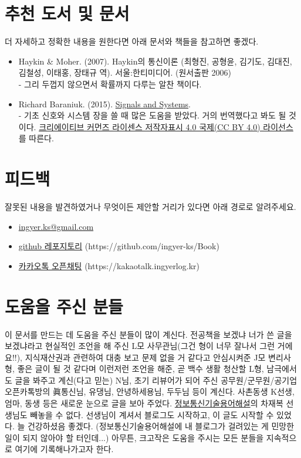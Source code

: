 \section{추천 도서 및 문서}
더 자세하고 정확한 내용을 원한다면 아래 문서와 책들을 참고하면 좋겠다.
\begin{itemize}
    \item Haykin \& Moher. (2007). Haykin의 통신이론 (최형진, 공형윤, 김기도, 김대진, 김철성, 이태홍, 장태규 역). 서울:한티미디어. (원서출판 2006) \\
    - 그리 두껍지 않으면서 확률까지 다루는 알찬 책이다.
    \item Richard Baraniuk. (2015). \href{https://cnx.org/contents/77608400-65b9-4f03-8a5f-536c611866bb@15.4/Signals-and-Systems}{Signals and Systems}. \\
    - 기초 신호와 시스템 장을 쓸 때 많은 도움을 받았다. 거의 번역했다고 봐도 될 것이다. \href{https://creativecommons.org/licenses/by/4.0/deed.ko}{크리에이티브 커먼즈 라이센스 저작자표시 4.0 국제(CC BY 4.0) 라이선스}를 따른다.
\end{itemize}

\section{피드백}
잘못된 내용을 발견하였거나 무엇이든 제안할 거리가 있다면 아래 경로로 알려주세요.
\begin{itemize}
    \item \href{mailto:ingyer.ks@gmail.com}{ingyer.ks@gmail.com}
    \item \href{https://github.com/ingyer-ks/Book}{github 레포지토리} (https://github.com/ingyer-ks/Book)
    \item \href{https://kakaotalk.ingyerlog.kr}{카카오톡 오픈채팅} (https://kakaotalk.ingyerlog.kr)
\end{itemize}
\section{도움을 주신 분들}
이 문서를 만드는 데 도움을 주신 분들이 많이 계신다.
전공책을 보겠냐 너가 쓴 글을 보겠냐라고 현실적인 조언을 해 주신 L모 사무관님(그건 형이 너무 잘나서 그런 거에요!!),
지식재산권과 관련하여 대충 보고 문제 없을 거 같다고 안심시켜준 J모 변리사 형, 좋은 글이 될 것 같다며 이런저런 조언을 해준, 곧 백수 생활 청산할 L형, 
남극에서도 글을 봐주고 계신(다고 믿는) N님, 초기 리뷰어가 되어 주신 공무원/군무원/공기업 오픈카톡방의 眞통신님, 유댕님, 안녕하세용님, 두두님 등이 계신다.
사촌동생 K선생, 엄마, 동생 등은 새로운 눈으로 글을 보아 주었다.
\href{http://www.ktword.co.kr/}{정보통신기술용어해설}의 차재복 선생님도 빼놓을 수 없다. 선생님이 계셔서 블로그도 시작하고, 이 글도 시작할 수 있었다. 늘 건강하셨음 좋겠다.
(정보통신기술용어해설에 내 블로그가 걸려있는 게 민망한 일이 되지 않아야 할 터인데...)
아무튼, 크고작은 도움을 주시는 모든 분들을 지속적으로 여기에 기록해나가고자 한다.

